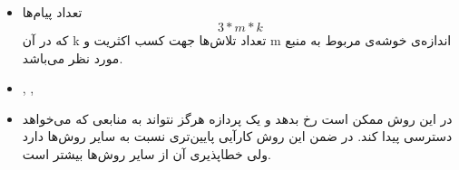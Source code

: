 \documentclass[paper=a4, fontsize=11pt]{article}
\numberwithin{equation}{section} %
\numberwithin{figure}{section} %
\numberwithin{table}{section} %
\begin{document}
\subsection{}
\begin{itemize}
    \item تعداد پیام‌ها
    \[
    3 * m * k
    \]
    که در آن k تعداد تلاش‌ها جهت کسب اکثریت و m اندازه‌ی خوشه‌ی مربوط به منبع مورد نظر می‌باشد.
    \item {}, , 
    \item
    در این روش ممکن است  رخ بدهد
    و یک پردازه هرگز نتواند به منابعی که می‌خواهد دسترسی پیدا کند.
    در ضمن این روش کارآیی پایین‌تری نسبت به سایر روش‌ها دارد ولی خطاپذیری آن از سایر روش‌ها بیشتر است.
\end{itemize}
\end{document}
